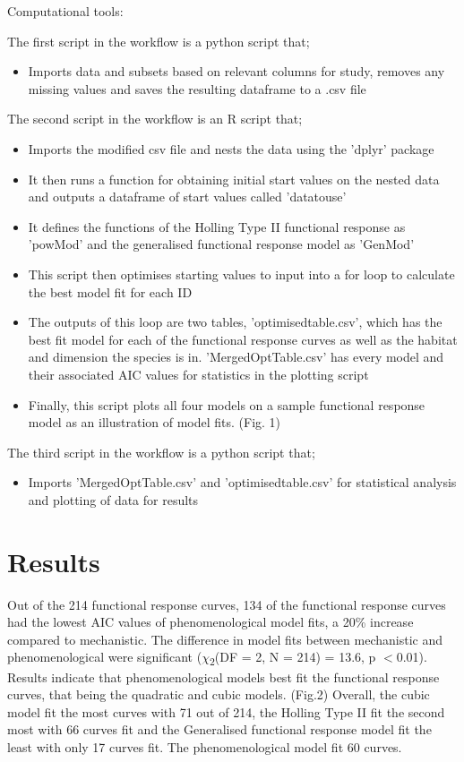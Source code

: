 \documentclass[11pt]{article}
\begin{document}
Computational tools: \newline



The first script in the workflow is a python script that;
	\begin{itemize}
	\item Imports data and subsets based on relevant columns for study, removes any missing values and saves the resulting dataframe to a .csv file 
	\end{itemize}

The second script in the workflow is an R script that;
\begin{itemize}
	\item Imports the modified csv file and nests the data using the 'dplyr' package 
	\item It then runs a function for obtaining initial start values on the nested data and outputs a dataframe of start values called 'datatouse'
	\item It defines the functions of the Holling Type II functional response as 'powMod' and the generalised functional response model as 'GenMod'
	\item This script then optimises starting values to input into a for loop to calculate the best model fit for each ID 
	\item The outputs of this loop are two tables, 'optimisedtable.csv', which has the best fit model for each of the functional response curves as well as the habitat and dimension the species is in. 'MergedOptTable.csv' has every model and their associated AIC values for statistics in the plotting script 
	\item Finally, this script plots all four models on a sample functional response model as an illustration of model fits. (Fig. 1)
\end{itemize}

The third script in the workflow is a python script that;
\begin{itemize}
	\item Imports 'MergedOptTable.csv' and 'optimisedtable.csv' for statistical analysis and plotting of data for results 
\end{itemize}


	\section*{Results}
\noindent

Out of the 214 functional response curves, 134 of the functional response curves had the lowest AIC values of phenomenological model fits, a 20\% increase compared to mechanistic. The difference in model fits between mechanistic and phenomenological were significant ($\chi$\textsubscript{2}(DF = 2, N = 214) = 13.6, p $<$0.01).  Results indicate that phenomenological models best fit the functional response curves, that being the quadratic and cubic models. (Fig.2) Overall, the cubic model fit the most curves with 71 out of 214, the Holling Type II fit the second most with 66 curves fit and the Generalised functional response model fit the least with only 17 curves fit. The phenomenological model fit 60 curves. \newline
\end{document}
